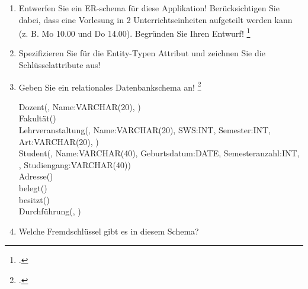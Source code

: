 \documentclass{bschlangaul-aufgabe}
\begin{document}
\begin{enumerate}


\item Entwerfen Sie ein ER-schema für diese Applikation!
Berücksichtigen Sie dabei, dass eine Vorlesung in 2
Unterrichtseinheiten aufgeteilt werden kann (z. B. Mo 10.00 und Do
14.00). Begründen Sie Ihren Entwurf!
\footcite{examen:66111:1996:03}


\item Spezifizieren Sie für die Entity-Typen Attribut und zeichnen Sie
die Schlüsselattribute aus!


\item Geben Sie ein relationales Datenbankschema an!
\footcite[Uni-ER-Modell, Aufgabe 2]{db:ab:4}

\begin{bAntwort}
\ttfamily
\footnotesize
Dozent(, Name:VARCHAR(20),
)\\

Fakultät()\\

Lehrveranstaltung(, Name:VARCHAR(20), SWS:INT,
Semester:INT, Art:VARCHAR(20), )\\

Student(, Name:VARCHAR(40), Geburtsdatum:DATE,
Semesteranzahl:INT, ,
Studiengang:VARCHAR(40))\\

Adresse()\\

belegt()\\

besitzt()\\

Durchführung(, )\\
\end{bAntwort}

\item Welche Fremdschlüssel gibt es in diesem Schema?
\end{enumerate}
\end{document}
